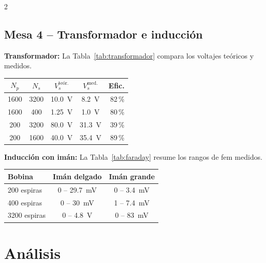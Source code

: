 \documentclass[10pt]{article}
\begin{document}
\begin{multicols}{2}
\subsection*{Mesa 4 – Transformador e inducción}

\textbf{Transformador:} La Tabla~\ref{tab:transformador} compara los voltajes teóricos y medidos.

\vspace{2pt}
\begin{center}
\vspace{2pt}
\small
\begin{tabular}{ccccr}
\toprule
$N_p$ & $N_s$ & $V_s^{\text{teór.}}$ & $V_s^{\text{med.}}$ & Efic.\\
\midrule
1600 & 3200 & 10.0~V & 8.2~V  & 82\,\%\\
1600 & 400  & 1.25~V & 1.0~V  & 80\,\%\\
200  & 3200 & 80.0~V & 31.3~V & 39\,\%\\
200  & 1600 & 40.0~V & 35.4~V & 89\,\%\\
\bottomrule
\end{tabular}
\end{center}
\vspace{2pt}

\textbf{Inducción con imán:} La Tabla~\ref{tab:faraday} resume los rangos de fem medidos.

\vspace{2pt}
\begin{center}
\vspace{2pt}
\small
\begin{tabular}{lcc}
\toprule
\textbf{Bobina} & \textbf{Imán delgado} & \textbf{Imán grande}\\
\midrule
200 espiras  & 0 -- 29.7~mV & 0 -- 3.4~mV \\
400 espiras  & 0 -- 30~mV   & 1 -- 7.4~mV \\
3200 espiras & 0 -- 4.8~V   & 0 -- 83~mV  \\
\bottomrule
\end{tabular}
\end{center}
\vspace{2pt}

\section{Análisis}


\end{multicols}
\end{document}
